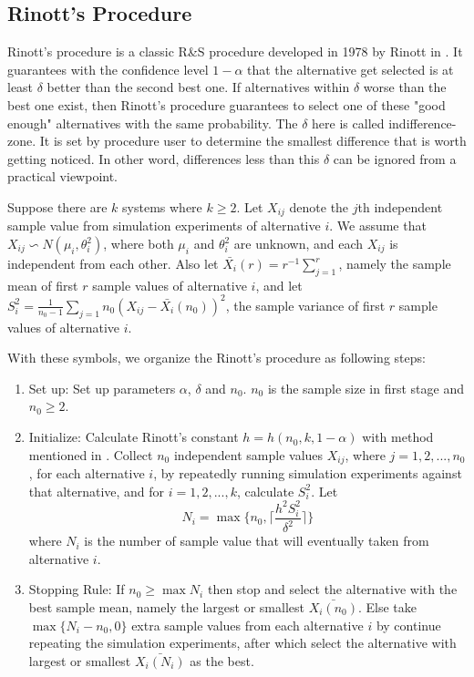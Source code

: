 \documentclass[12pt,a4paper]{report}
\begin{document}
\subsection{Rinott's Procedure}

Rinott's procedure is a classic R\&S procedure developed in 1978 by Rinott in \cite{cistam1978rinott}. It guarantees with the confidence level $1 - \alpha$ that the alternative get selected is at least $\delta$ better than the second best one. If alternatives within $\delta$ worse than the best one exist, then Rinott's procedure guarantees to select one of these "good enough" alternatives with the same probability. The $\delta$ here is called indifference-zone. It is set by procedure user to determine the smallest difference that is worth getting noticed. In other word, differences less than this $\delta$ can be ignored from a practical viewpoint.

Suppose there are $k$ systems where $k \geqslant 2$. Let $X_{ij}$ denote the $j$th independent sample value from simulation experiments of alternative $i$. We assume that $X_{ij} \backsim N(\mu_i, \theta_i^2)$, where both $\mu_i$ and $\theta_i^2$ are unknown, and each $X_{ij}$ is independent from each other. Also let $\bar{X_i}(r) = r^{-1}\sum_{j=1}^r$, namely the sample mean of first $r$ sample values of alternative $i$, and let $S_i^2 = \frac{1}{n_0 - 1}\sum_{j=1}{n_0}(X_{ij} - \bar{X_i}(n_0))^2$, the sample variance of first $r$ sample values of alternative $i$.

With these symbols, we organize the Rinott's procedure as following steps:

\begin{enumerate}
\item{Set up: } Set up parameters $\alpha$, $\delta$ and $n_0$. $n_0$ is the sample size in first stage and $n_0 \geqslant 2$.
\item{Initialize: } Calculate Rinott's constant $h = h(n_0, k, 1 - \alpha)$ with method mentioned in \cite{rinott-constant}. Collect $n_0$ independent sample values $X_{ij}$, where $j = 1, 2,...,n_0$, for each alternative $i$, by repeatedly running simulation experiments against that alternative, and for $i = 1, 2,...,k$, calculate $S_i^2$. Let 
$$ N_i = \max\{n_0, \lceil \frac{h^2S_i^2}{\delta^2} \rceil\} $$ where $N_i$ is the number of sample value that will eventually taken from alternative $i$.
\item{Stopping Rule: } If $n_0 \geqslant \max N_i$ then stop and select the alternative with the best sample mean, namely the largest or smallest $\bar{X_i(n_0)}$. Else take $\max\{N_i - n_0, 0\}$ extra sample values from each alternative $i$ by continue repeating the simulation experiments, after which select the alternative with largest or smallest $\bar{X_i(N_i)}$ as the best.
\end{enumerate}
\end{document}
